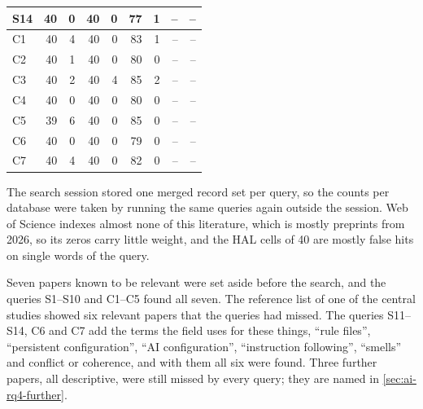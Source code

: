 \begin{table}[htbp]
\begin{sidecaption}
\begin{tabular}{@{}lrrrrrrrr@{}}
      S14 & 40 & 0    & 40    & 0   & 77    & 1   & -- & --   \\
      \midrule
      C1  & 40 & 4    & 40    & 0   & 83    & 1   & -- & --   \\
      C2  & 40 & 1    & 40    & 0   & 80    & 0   & -- & --   \\
      C3  & 40 & 2    & 40    & 4   & 85    & 2   & -- & --   \\
      C4  & 40 & 0    & 40    & 0   & 80    & 0   & -- & --   \\
      C5  & 39 & 6    & 40    & 0   & 85    & 0   & -- & --   \\
      C6  & 40 & 0    & 40    & 0   & 79    & 0   & -- & --   \\
      C7  & 40 & 4    & 40    & 0   & 82    & 0   & -- & --   \\
      \bottomrule
    \end{tabular}
  \end{sidecaption}
\end{table}

The search session stored one merged record set per query, so the counts per
database were taken by running the same queries again outside the session.
Web of Science indexes almost none of this literature, which is mostly
preprints from 2026, so its zeros carry little weight, and the HAL cells of 40
are mostly false hits on single words of the query.

Seven papers known to be relevant were set aside before the search, and the
queries S1--S10 and C1--C5 found all seven.
The reference list of one of the central studies\autocite{xu2026stale} showed
six relevant papers that the queries had missed.
The queries S11--S14, C6 and C7 add the terms the field uses for these things,
\enquote{rule files}, \enquote{persistent configuration}, \enquote{AI
configuration}, \enquote{instruction following}, \enquote{smells} and conflict
or coherence, and with them all six were found.
Three further papers, all descriptive, were still missed by every query; they
are named in \cref{sec:ai-rq4-further}.

